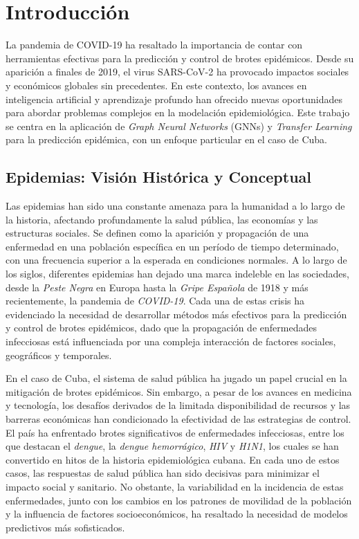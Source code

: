 \chapter*{Introducción}\label{chapter:introduction}

La pandemia de COVID-19 ha resaltado la importancia de contar con herramientas efectivas para la predicción y control de brotes epidémicos. Desde su aparición a finales de 2019, el virus SARS-CoV-2 ha provocado impactos sociales y económicos globales sin precedentes. En este contexto, los avances en inteligencia artificial y aprendizaje profundo han ofrecido nuevas oportunidades para abordar problemas complejos en la modelación epidemiológica. Este trabajo se centra en la aplicación de \textit{Graph Neural Networks} (GNNs) y \textit{Transfer Learning} para la predicción epidémica, con un enfoque particular en el caso de Cuba.

\section*{Epidemias: Visión Histórica y Conceptual}

Las epidemias han sido una constante amenaza para la humanidad a lo largo de la historia, afectando profundamente la salud pública, las economías y las estructuras sociales. Se definen como la aparición y propagación de una enfermedad en una población específica en un período de tiempo determinado, con una frecuencia superior a la esperada en condiciones normales. A lo largo de los siglos, diferentes epidemias han dejado una marca indeleble en las sociedades, desde la \textit{Peste Negra} en Europa hasta la \textit{Gripe Española} de 1918 y más recientemente, la pandemia de \textit{COVID-19}. Cada una de estas crisis ha evidenciado la necesidad de desarrollar métodos más efectivos para la predicción y control de brotes epidémicos, dado que la propagación de enfermedades infecciosas está influenciada por una compleja interacción de factores sociales, geográficos y temporales.

En el caso de Cuba, el sistema de salud pública ha jugado un papel crucial en la mitigación de brotes epidémicos. Sin embargo, a pesar de los avances en medicina y tecnología, los desafíos derivados de la limitada disponibilidad de recursos y las barreras económicas han condicionado la efectividad de las estrategias de control. El país ha enfrentado brotes significativos de enfermedades infecciosas, entre los que destacan el \textit{dengue}, la \textit{dengue hemorrágico}, \textit{HIV} y \textit{H1N1}, los cuales se han convertido en hitos de la historia epidemiológica cubana. En cada uno de estos casos, las respuestas de salud pública han sido decisivas para minimizar el impacto social y sanitario. No obstante, la variabilidad en la incidencia de estas enfermedades, junto con los cambios en los patrones de movilidad de la población y la influencia de factores socioeconómicos, ha resaltado la necesidad de modelos predictivos más sofisticados.

